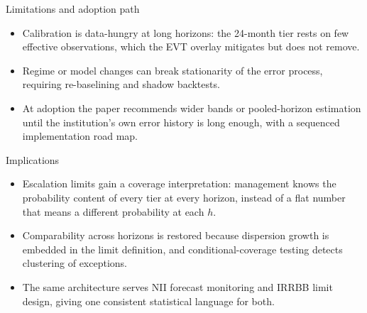 \documentclass[aspectratio=169,11pt]{beamer}
\begin{document}
\begin{frame}{Limitations and adoption path}
  \begin{itemize}
    \item Calibration is data-hungry at long horizons: the 24-month tier
          rests on few effective observations, which the EVT overlay
          mitigates but does not remove.
    \item Regime or model changes can break stationarity of the error
          process, requiring re-baselining and shadow backtests.
    \item At adoption the paper recommends wider bands or pooled-horizon
          estimation until the institution's own error history is long
          enough, with a sequenced implementation road map.
  \end{itemize}
\end{frame}

\begin{frame}{Implications}
  \begin{itemize}
    \item Escalation limits gain a coverage interpretation: management knows
          the probability content of every tier at every horizon, instead of
          a flat number that means a different probability at each $h$.
    \item Comparability across horizons is restored because dispersion
          growth is embedded in the limit definition, and
          conditional-coverage testing detects clustering of exceptions.
    \item The same architecture serves NII forecast monitoring and IRRBB
          limit design, giving one consistent statistical language for both.
  \end{itemize}
\end{frame}
\end{document}
